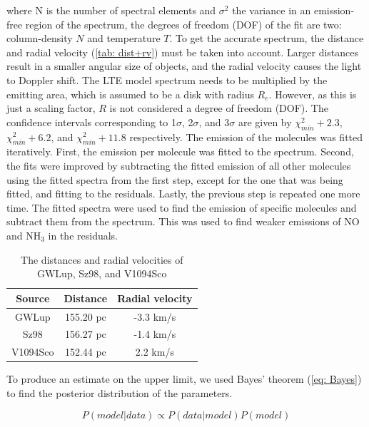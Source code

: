 \documentclass[twoside, single, authoryear, semicolon, 12pt]{lion-msc}
\newcommand{\4}{$_4$}
\newcommand{\3}{$_3$}
\newcommand{\2}{$_2$}
\begin{document}
where N is the number of spectral elements and $\sigma^2$ the variance in an emission-free region of the spectrum, the degrees of freedom (DOF) of the fit are two: column-density $N$ and temperature $T$. To get the accurate spectrum, the distance and radial velocity (\autoref{tab: dist+rv}) must be taken into account. Larger distances result in a smaller angular size of objects, and the radial velocity causes the light to Doppler shift. The LTE model spectrum needs to be multiplied by the emitting area, which is assumed to be a disk with radius $R_e$. However, as this is just a scaling factor, $R$ is not considered a degree of freedom (DOF). The confidence intervals corresponding to 1$\sigma$, 2$\sigma$, and 3$\sigma$ are given by $\chi^2_{min}+2.3$, $\chi^2_{min}+6.2$, and $\chi^2_{min}+11.8$ respectively. The emission of the molecules was fitted iteratively. First, the emission per molecule was fitted to the spectrum. Second, the fits were improved by subtracting the fitted emission of all other molecules using the fitted spectra from the first step, except for the one that was being fitted, and fitting to the residuals. Lastly, the previous step is repeated one more time. 
The fitted spectra were used to find the emission of specific molecules and subtract them from the spectrum. This was used to find weaker emissions of NO and NH\3 in the residuals. 

\begin{table}[H]
\centering
\begin{tabular}{ccc}
\hline
Source   & \makecell{Distance \\\citep{henning2024mindsjwstmirimidinfrared}}  & \makecell{Radial velocity \\ \citep{Frasca_2017}} \\ \hline
GWLup    & 155.20 pc & -3.3 km/s       \\
Sz98     & 156.27 pc & -1.4 km/s       \\
V1094Sco & 152.44 pc & 2.2 km/s        \\ \hline
\end{tabular}
\caption{The distances and radial velocities of GWLup, Sz98, and V1094Sco}
\label{tab: dist+rv}
\end{table}

To produce an estimate on the upper limit, we used Bayes' theorem (\autoref{eq: Bayes}) to find the posterior distribution of the parameters. 

\begin{equation}
    P(model|data)\propto P(data|model)P(model)
    \label{eq: Bayes}
\end{equation}
\end{document}
